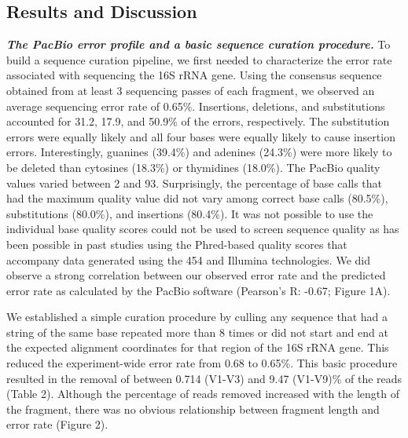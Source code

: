\documentclass[11pt,]{article}
\begin{document}
\subsection{Results and Discussion}\label{results-and-discussion}

\textbf{\emph{The PacBio error profile and a basic sequence curation
procedure.}} To build a sequence curation pipeline, we first needed to
characterize the error rate associated with sequencing the 16S rRNA
gene. Using the consensus sequence obtained from at least 3 sequencing
passes of each fragment, we observed an average sequencing error rate of
0.65\%. Insertions, deletions, and substitutions accounted for 31.2,
17.9, and 50.9\% of the errors, respectively. The substitution errors
were equally likely and all four bases were equally likely to cause
insertion errors. Interestingly, guanines (39.4\%) and adenines (24.3\%)
were more likely to be deleted than cytosines (18.3\%) or thymidines
(18.0\%). The PacBio quality values varied between 2 and 93.
Surprisingly, the percentage of base calls that had the maximum quality
value did not vary among correct base calls (80.5\%), substitutions
(80.0\%), and insertions (80.4\%). It was not possible to use the
individual base quality scores could not be used to screen sequence
quality as has been possible in past studies using the Phred-based
quality scores that accompany data generated using the 454 and Illumina
technologies. We did observe a strong correlation between our observed
error rate and the predicted error rate as calculated by the PacBio
software (Pearson's R: -0.67; Figure 1A).

We established a simple curation procedure by culling any sequence that
had a string of the same base repeated more than 8 times or did not
start and end at the expected alignment coordinates for that region of
the 16S rRNA gene. This reduced the experiment-wide error rate from 0.68
to 0.65\%. This basic procedure resulted in the removal of between 0.714
(V1-V3) and 9.47 (V1-V9)\% of the reads (Table 2). Although the
percentage of reads removed increased with the length of the fragment,
there was no obvious relationship between fragment length and error rate
(Figure 2).
\end{document}
